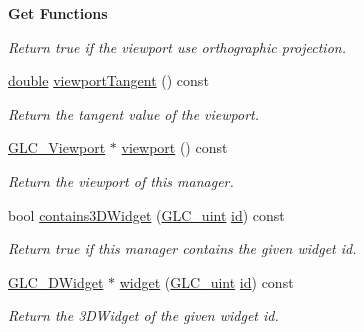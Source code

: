 \begin{Indent}{\bf Get Functions}
\begin{DoxyCompactItemize}
\begin{DoxyCompactList}\small\item\em Return true if the viewport use orthographic projection. \end{DoxyCompactList}\item 
\hyperlink{_super_l_u_support_8h_a8956b2b9f49bf918deed98379d159ca7}{double} \hyperlink{class_g_l_c__3_d_widget_manager_handle_ada89c6b38170f221213de87038caa37b}{viewport\-Tangent} () const 
\begin{DoxyCompactList}\small\item\em Return the tangent value of the viewport. \end{DoxyCompactList}\item 
\hyperlink{class_g_l_c___viewport}{G\-L\-C\-\_\-\-Viewport} $\ast$ \hyperlink{class_g_l_c__3_d_widget_manager_handle_ab108d25ffbbef194ca8a642b93fe817c}{viewport} () const 
\begin{DoxyCompactList}\small\item\em Return the viewport of this manager. \end{DoxyCompactList}\item 
bool \hyperlink{class_g_l_c__3_d_widget_manager_handle_af2986da5dbc2b41cdcc108b303873ae2}{contains3\-D\-Widget} (\hyperlink{glc__global_8h_abf950976fabed69026558df8e2da6c6b}{G\-L\-C\-\_\-uint} \hyperlink{glext_8h_a58c2a664503e14ffb8f21012aabff3e9}{id}) const 
\begin{DoxyCompactList}\small\item\em Return true if this manager contains the given widget id. \end{DoxyCompactList}\item 
\hyperlink{class_g_l_c__3_d_widget}{G\-L\-C\-\_\-D\-Widget} $\ast$ \hyperlink{class_g_l_c__3_d_widget_manager_handle_a250a83acbace68f8cdf742a8a2563925}{widget} (\hyperlink{glc__global_8h_abf950976fabed69026558df8e2da6c6b}{G\-L\-C\-\_\-uint} \hyperlink{glext_8h_a58c2a664503e14ffb8f21012aabff3e9}{id}) const 
\begin{DoxyCompactList}\small\item\em Return the 3\-D\-Widget of the given widget id. \end{DoxyCompactList}\end{DoxyCompactItemize}
\end{Indent}
